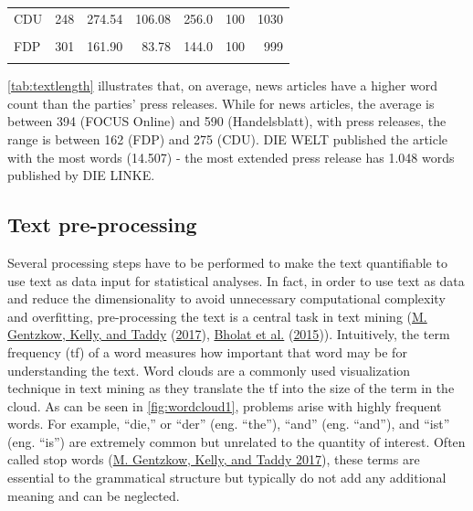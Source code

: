 \documentclass[
]{article}
\begin{document}
\begin{table}[H]
\begin{tabular}[t]{lrrrrrr}
\hspace{1em}CDU & 248 & 274.54 & 106.08 & 256.0 & 100 & 1030\\
\hspace{1em}\cellcolor{gray!6}{DIE LINKE} & \cellcolor{gray!6}{686} & \cellcolor{gray!6}{200.47} & \cellcolor{gray!6}{71.78} & \cellcolor{gray!6}{190.0} & \cellcolor{gray!6}{101} & \cellcolor{gray!6}{1048}\\
\hspace{1em}FDP & 301 & 161.90 & 83.78 & 144.0 & 100 & 999\\
\hspace{1em}\cellcolor{gray!6}{SPD} & \cellcolor{gray!6}{315} & \cellcolor{gray!6}{213.41} & \cellcolor{gray!6}{56.16} & \cellcolor{gray!6}{208.0} & \cellcolor{gray!6}{103} & \cellcolor{gray!6}{429}\\
\bottomrule
\end{tabular}
\end{table}

\autoref{tab:textlength} illustrates that, on average, news articles
have a higher word count than the parties' press releases. While for
news articles, the average is between 394 (FOCUS Online) and 590
(Handelsblatt), with press releases, the range is between 162 (FDP) and
275 (CDU). DIE WELT published the article with the most words (14.507) -
the most extended press release has 1.048 words published by DIE LINKE.

\hypertarget{text-pre-processing}{%
\subsection{Text pre-processing}\label{text-pre-processing}}

Several processing steps have to be performed to make the text
quantifiable to use text as data input for statistical analyses. In
fact, in order to use text as data and reduce the dimensionality to
avoid unnecessary computational complexity and overfitting,
pre-processing the text is a central task in text mining
(\protect\hyperlink{ref-gentzkow_text_2017}{M. Gentzkow, Kelly, and
Taddy} (\protect\hyperlink{ref-gentzkow_text_2017}{2017}),
\protect\hyperlink{ref-bholat_text_2015}{Bholat et al.}
(\protect\hyperlink{ref-bholat_text_2015}{2015})). Intuitively, the term
frequency (tf) of a word measures how important that word may be for
understanding the text. Word clouds are a commonly used visualization
technique in text mining as they translate the tf into the size of the
term in the cloud. As can be seen in \autoref{fig:wordcloud1}, problems
arise with highly frequent words. For example, ``die,'' or ``der'' (eng.
``the''), ``and'' (eng. ``and''), and ``ist'' (eng. ``is'') are
extremely common but unrelated to the quantity of interest. Often called
stop words (\protect\hyperlink{ref-gentzkow_text_2017}{M. Gentzkow,
Kelly, and Taddy 2017}), these terms are essential to the grammatical
structure but typically do not add any additional meaning and can be
neglected.
\end{document}
